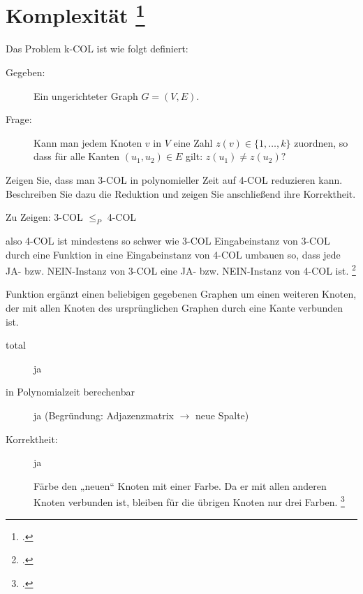 \documentclass{lehramt-informatik-aufgabe}
\begin{document}
\section{Komplexität
\footcite{66115:2016:03}}


Das Problem k-COL ist wie folgt definiert:

\begin{description}
\item[Gegeben:]

Ein ungerichteter Graph $G = (V, E)$.

\item[Frage:]

Kann man jedem Knoten $v$ in $V$ eine Zahl $z(v) \in \{1, \dots ,k\}$
zuordnen, so dass für alle Kanten $(u_1,u_2) \in E$ gilt: $z(u_1) \neq
z(u_2)?$
\end{description}

\noindent
Zeigen Sie, dass man 3-COL in polynomieller Zeit auf 4-COL reduzieren
kann. Beschreiben Sie dazu die Reduktion und zeigen Sie anschließend
ihre Korrektheit.

\begin{liAntwort}
Zu Zeigen: 3-COL $\leq_P$ 4-COL

also 4-COL ist mindestens so schwer wie 3-COL Eingabeinstanz von 3-COL
durch eine Funktion in eine Eingabeinstanz von 4-COL umbauen so, dass
jede JA- bzw. NEIN-Instanz von 3-COL eine JA- bzw. NEIN-Instanz von
4-COL ist.
\footcite[Seite 67]{theo:fs:4}

Funktion ergänzt einen beliebigen gegebenen Graphen um einen
weiteren Knoten, der mit allen Knoten des ursprünglichen Graphen
durch eine Kante verbunden ist.

\begin{description}
\item[total]

ja

\item[in Polynomialzeit berechenbar]

ja
(Begründung: \zB Adjazenzmatrix $\rightarrow$ neue Spalte)

\item[Korrektheit:]

ja

Färbe den „neuen“ Knoten mit einer Farbe. Da er mit allen anderen Knoten
verbunden ist, bleiben für die übrigen Knoten nur drei Farben.
\footcite[Seite 69]{theo:fs:4}
\end{description}
\end{liAntwort}
\end{document}
